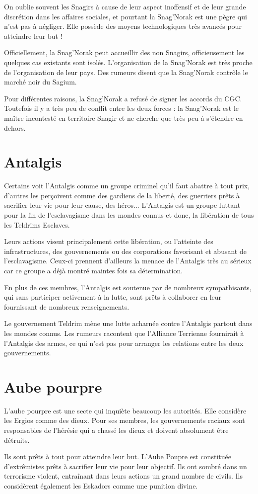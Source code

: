 \begin{multicols*}{2}
On oublie souvent les Snagirs à cause de leur aspect inoffensif et de leur grande discrétion dans les affaires sociales, et pourtant la Snag’Norak est une pègre qui n’est pas à négliger. Elle possède des moyens technologiques très avancés pour atteindre leur but !

Officiellement, la Snag’Norak peut accueillir des non Snagirs, officieusement les quelques cas existants sont isolés. L’organisation de la Snag’Norak est très proche de l’organisation de leur pays. Des rumeurs disent que la Snag’Norak contrôle le marché noir du Sagium.

Pour différentes raisons, la Snag'Norak a refusé de signer les accords du CGC. Toutefois il y a très peu de conflit entre les deux forces : la Snag'Norak est le maître incontesté en territoire Snagir et ne cherche que très peu à s'étendre en dehors.

\section{Antalgis}

Certains voit l'Antalgis comme un groupe criminel qu'il faut abattre à tout prix, d'autres les perçoivent comme des gardiens de la liberté, des guerriers prêts à sacrifier leur vie pour leur cause, des héros... L'Antalgis est un groupe luttant pour la fin de l'esclavagisme dans les mondes connus et donc, la libération de tous les Teldrims Esclaves.

Leurs actions visent principalement cette libération, ou l'atteinte des infrastructures, des gouvernements ou des corporations favorisant et abusant de l'esclavagisme. Ceux-ci prennent d'ailleurs la menace de l'Antalgis très au sérieux car ce groupe a déjà montré maintes fois sa détermination.

En plus de ces membres, l'Antalgis est soutenue par de nombreux sympathisants, qui sans participer activement à la lutte, sont prêts à collaborer en leur fournissant de nombreux renseignements.

Le gouvernement Teldrim mène une lutte acharnée contre l'Antalgis partout dans les mondes connus. Les rumeurs racontent que l'Alliance Terrienne fournirait à l'Antalgis des armes, ce qui n'est pas pour arranger les relations entre les deux gouvernements.

\section{Aube pourpre}

L'aube pourpre est une secte qui inquiète beaucoup les autorités. Elle considère les Ergios comme des dieux. Pour ses membres, les gouvernements raciaux sont responsables de l'hérésie qui a chassé les dieux et doivent absolument être détruits.

Ils sont prêts à tout pour atteindre leur but. L'Aube Poupre est constituée d'extrêmistes prêts à sacrifier leur vie pour leur objectif. Ils ont sombré dans un terrorisme violent, entraînant dans leurs actions un grand nombre de civils. Ils considèrent également les Eskadors comme une punition divine.

\end{multicols*}
